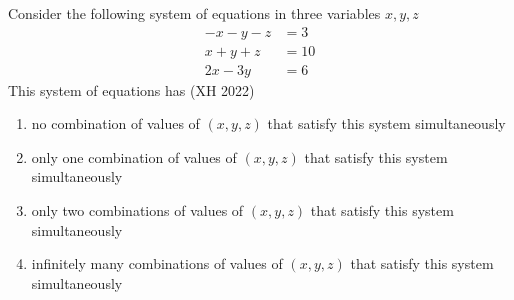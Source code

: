 \item Consider the following system of equations in three variables $x,y,z$
	\begin{align*}
    -x-y-z&=3
    \\
    x+y+z&=10
    \\
    2x-3y&=6
\end{align*}
This system of equations has
\hfill (XH 2022)
\begin{enumerate}
\item no combination of values of $(x,y,z)$ that satisfy this system simultaneously
\item only one combination of values of $(x,y,z)$ that satisfy this system simultaneously
\item only two combinations of values of $(x,y,z)$ that satisfy this system simultaneously
\item infinitely many combinations of values of $(x,y,z)$ that satisfy this system simultaneously
\end{enumerate}
